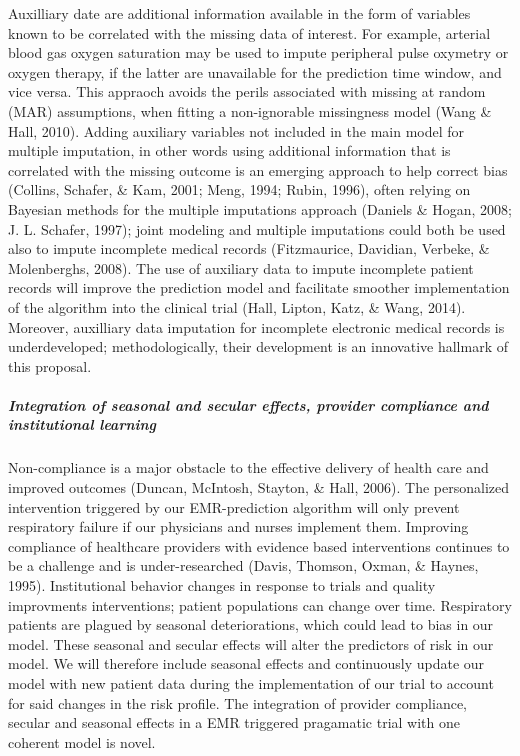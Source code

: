 \documentclass[]{article}
\begin{document}
Auxilliary date are additional information available in the form of
variables known to be correlated with the missing data of interest. For
example, arterial blood gas oxygen saturation may be used to impute
peripheral pulse oxymetry or oxygen therapy, if the latter are
unavailable for the prediction time window, and vice versa. This
appraoch avoids the perils associated with missing at random (MAR)
assumptions, when fitting a non-ignorable missingness model (Wang \&
Hall, 2010). Adding auxiliary variables not included in the main model
for multiple imputation, in other words using additional information
that is correlated with the missing outcome is an emerging approach to
help correct bias (Collins, Schafer, \& Kam, 2001; Meng, 1994; Rubin,
1996), often relying on Bayesian methods for the multiple imputations
approach (Daniels \& Hogan, 2008; J. L. Schafer, 1997); joint modeling
and multiple imputations could both be used also to impute incomplete
medical records (Fitzmaurice, Davidian, Verbeke, \& Molenberghs, 2008).
The use of auxiliary data to impute incomplete patient records will
improve the prediction model and facilitate smoother implementation of
the algorithm into the clinical trial (Hall, Lipton, Katz, \& Wang,
2014). Moreover, auxilliary data imputation for incomplete electronic
medical records is underdeveloped; methodologically, their development
is an innovative hallmark of this proposal.

\subparagraph{Integration of seasonal and secular effects, provider
compliance and institutional
learning}\label{integration-of-seasonal-and-secular-effects-provider-compliance-and-institutional-learning}

Non-compliance is a major obstacle to the effective delivery of health
care and improved outcomes (Duncan, McIntosh, Stayton, \& Hall, 2006).
The personalized intervention triggered by our EMR-prediction algorithm
will only prevent respiratory failure if our physicians and nurses
implement them. Improving compliance of healthcare providers with
evidence based interventions continues to be a challenge and is
under-researched (Davis, Thomson, Oxman, \& Haynes, 1995). Institutional
behavior changes in response to trials and quality improvments
interventions; patient populations can change over time. Respiratory
patients are plagued by seasonal deteriorations, which could lead to
bias in our model. These seasonal and secular effects will alter the
predictors of risk in our model. We will therefore include seasonal
effects and continuously update our model with new patient data during
the implementation of our trial to account for said changes in the risk
profile. The integration of provider compliance, secular and seasonal
effects in a EMR triggered pragamatic trial with one coherent model is
novel.
\end{document}
